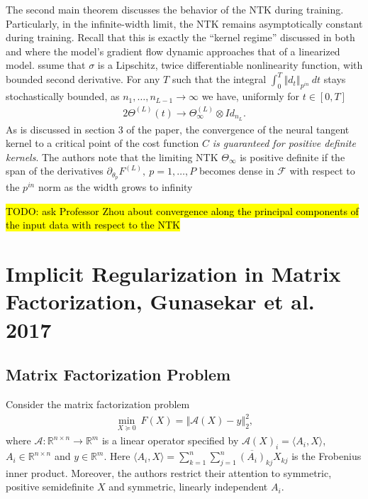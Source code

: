\documentclass{article}
\newenvironment{manualtheorem}[1]{%
  \renewcommand\themanualtheoreminner{#1}%
  \manualtheoreminner
}{\endmanualtheoreminner}
\begin{document}
The second main theorem discusses the behavior of the NTK during training. Particularly, in the infinite-width limit, the NTK remains asymptotically constant during training. Recall that this is exactly the \enquote{kernel regime} discussed in both \cite{woodworth2020kernel} and \cite{chizat2018lazy} where the model's gradient flow dynamic approaches that of a linearized model.
\begin{manualtheorem}
Assume that $\sigma$ is a Lipschitz, twice differentiable nonlinearity function, with bounded second derivative. For any $T$ such that the integral $\int_0^T \left\Vert d_t \right\Vert_{p^{in}} \ dt$ stays stochastically bounded, as $n_1, \ldots, n_{L-1} \rightarrow \infty$ we have, uniformly for $t \in [0, T]$
\begin{align*}{2}
    \Theta^{(L)}(t) \rightarrow \Theta_{\infty}^{(L)} \otimes Id_{n_L}.
\end{align*}
\end{manualtheorem}
As is discussed in section 3 of the paper, the convergence of the neural tangent kernel to a critical point of the cost function $C$ \textit{is guaranteed for positive definite kernels}. The authors note that the limiting NTK $\Theta_{\infty}$ is positive definite if the span of the derivatives $\partial_{\theta_p}F^{(L)}, \ p = 1, \ldots, P$ becomes dense in $\mathcal{F}$ with respect to the $p^{in}$ norm as the width grows to infinity

\hl{TODO: ask Professor Zhou about convergence along the principal components of the input data with respect to the NTK}

\section{Implicit Regularization in Matrix Factorization, Gunasekar et al. 2017}
\subsection{Matrix Factorization Problem}
Consider the matrix factorization problem
\begin{align*}
    \underset{X \succeq 0}{\min} \ F(X) = \left\Vert \mathcal{A}(X) - y \right\Vert_2^2,
\end{align*}
where $\mathcal{A}: \mathbb{R}^{n \times n} \rightarrow \mathbb{R}^m$ is a linear operator specified by $\mathcal{A}(X)_i = \langle A_i, X \rangle$, $A_i \in \mathbb{R}^{n \times n}$ and $y \in \mathbb{R}^m$. Here $\langle A_i, X \rangle = \sum_{k=1}^n \sum_{j=1}^n \overline{(A_i)}_{kj} X_{kj}$ is the Frobenius inner product. Moreover, the authors restrict their attention to symmetric, positive semidefinite $X$ and symmetric, linearly independent $A_i$.
\end{document}
